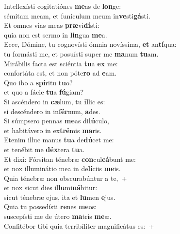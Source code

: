 \evenverse Intellexísti cogitatiónes \textbf{me}as de \textbf{lon}ge:~\*\\
\evenverse sémitam meam, et funículum meum in\textbf{ve}sti\textbf{gá}sti.\\
\oddverse Et omnes vias meas \textbf{præ}vi\textbf{dí}sti:~\*\\
\oddverse quia non est sermo in \textbf{lin}gua \textbf{me}a.\\
\evenverse Ecce, Dómine, tu cognovísti ómnia novíssima, \textbf{et} an\textbf{tí}qua:~\*\\
\evenverse tu formásti me, et posuísti super me \textbf{ma}num \textbf{tu}am.\\
\oddverse Mirábilis facta est sciéntia \textbf{tu}a \textbf{ex} me:~\*\\
\oddverse confortáta est, et non póte\textbf{ro} ad \textbf{e}am.\\
\evenverse Quo ibo a \textbf{spí}ritu \textbf{tu}o?~\*\\
\evenverse et quo a fácie \textbf{tu}a \textbf{fú}giam?\\
\oddverse Si ascéndero in \textbf{cæ}lum, tu \textbf{il}lic es:~\*\\
\oddverse si descéndero in in\textbf{fér}num, \textbf{a}des.\\
\evenverse Si súmpsero pennas \textbf{me}as di\textbf{lú}culo,~\*\\
\evenverse et habitávero in ex\textbf{tré}mis \textbf{ma}ris.\\
\oddverse Etenim illuc manus \textbf{tu}a de\textbf{dú}cet me:~\*\\
\oddverse et tenébit me \textbf{déx}tera \textbf{tu}a.\\
\evenverse Et dixi: Fórsitan ténebræ \textbf{con}cul\textbf{cá}bunt me:~\*\\
\evenverse et nox illuminátio mea in de\textbf{lí}ciis \textbf{me}is.\\
\oddverse Quia ténebræ non obscurabúntur a te,~+\\
\oddverse  et nox sicut dies il\textbf{lu}mi\textbf{ná}bitur:~\*\\
\oddverse sicut ténebræ ejus, ita et \textbf{lu}men \textbf{e}jus.\\
\evenverse Quia tu possedísti \textbf{re}nes \textbf{me}os:~\*\\
\evenverse suscepísti me de útero \textbf{ma}tris \textbf{me}æ.\\
\oddverse Confitébor tibi quia terribíliter magnificátus es:~+\\

